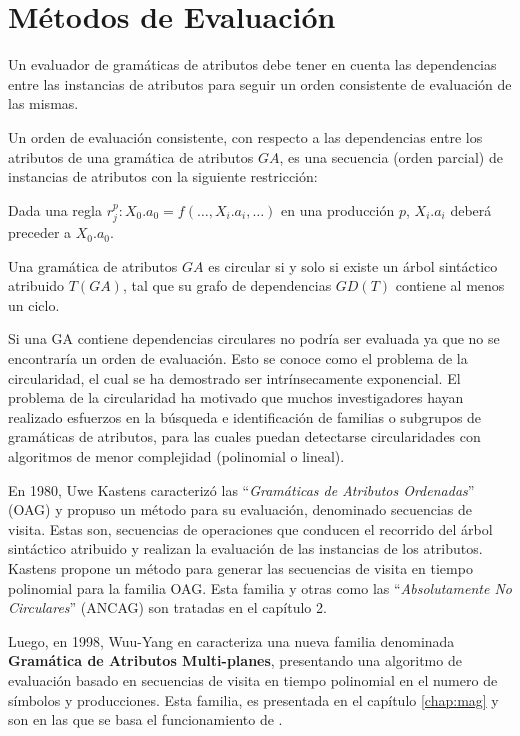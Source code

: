 \section{Métodos de Evaluación}
\label{sec:met_eval}
Un evaluador de gramáticas de atributos debe tener en cuenta las dependencias entre las instancias de atributos para seguir un orden consistente de evaluación de las mismas.

\begin{definition} Un orden de evaluación consistente, con respecto a las dependencias entre los atributos de una gramática de atributos $GA$, es una secuencia (orden parcial) de instancias de atributos con la siguiente restricción:

Dada una regla $r_{j}^{p} : X_{0}.a_{0} = f(\ldots, X_{i}.a_{i}, \ldots)$ en una producción $p$, 
$X_{i}.a_{i}$ deberá preceder a $X_{0}.a_{0}$.
\end{definition}

\begin{definition} 
Una gramática de atributos $GA$ es circular si y solo si existe un árbol sintáctico atribuido $T(GA)$, tal que su grafo de dependencias $GD(T)$ contiene al menos un ciclo.
\end{definition}

Si una GA contiene dependencias circulares no podría ser evaluada ya que no se encontraría un orden de evaluación. Esto se conoce como el problema de la circularidad, el cual se ha demostrado ser intrínsecamente exponencial\cite{intri-exc}. El problema de la circularidad ha motivado que muchos investigadores hayan realizado esfuerzos en la búsqueda e identificación de familias o subgrupos de gramáticas de atributos, para las cuales puedan detectarse circularidades con algoritmos de menor complejidad (polinomial o lineal).

En 1980, Uwe Kastens\cite{kastens} caracterizó las ``\textit{Gramáticas de Atributos Ordenadas}'' (OAG) y propuso un método para su evaluación, denominado secuencias de visita. Estas son, secuencias de operaciones que conducen el recorrido del árbol sintáctico atribuido y realizan la evaluación de las instancias de los atributos. Kastens propone un método para generar las secuencias de visita en tiempo polinomial para la familia OAG. Esta familia y otras como las ``\textit{Absolutamente No Circulares}'' (ANCAG) son tratadas en el capítulo 2.

Luego, en 1998, Wuu-Yang en \cite{wuu-yang1} caracteriza una nueva familia denominada \textbf{Gramática de Atributos Multi-planes}, presentando una algoritmo de evaluación basado en secuencias de visita en tiempo polinomial en el numero de símbolos y producciones. Esta familia, es presentada en el capítulo \ref{chap:mag} y son en las que se basa el funcionamiento de \maggen.  

